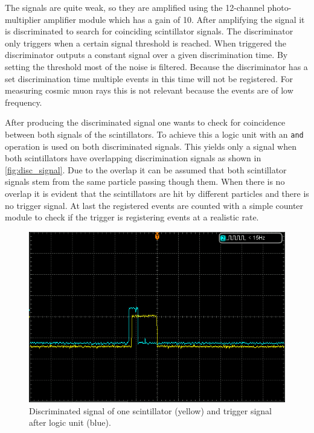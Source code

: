 \documentclass[sn-mathphys-num,iicol]{sn-jnl}
\theoremstyle{thmstyleone}
\theoremstyle{thmstyletwo}
\theoremstyle{thmstylethree}
\begin{document}
The signals are quite weak, so they are amplified using the 12-channel photo-multiplier amplifier module which has a gain of 10.
After amplifying the signal it is discriminated to search for coinciding scintillator signals.
The discriminator only triggers when a certain signal threshold is reached. 
When triggered the discriminator outputs a constant signal over a given discrimination time.
By setting the threshold most of the noise is filtered.
Because the discriminator has a set discrimination time multiple events in this time will not be registered. 
For measuring cosmic muon rays this is not relevant because the events are of low frequency.

After producing the discriminated signal one wants to check for coincidence between both signals of the scintillators.
To achieve this a logic unit with an \texttt{and} operation is used on both discriminated signals.
This yields only a signal when both scintillators have overlapping discrimination signals as shown in \autoref{fig:disc_signal}.
Due to the overlap it can be assumed that both scintillator signals stem from the same particle passing though them.
When there is no overlap it is evident that the scintillators are hit by different particles and there is no trigger signal.
At last the registered events are counted with a simple counter module to check if the trigger is registering events at a realistic rate.

\begin{figure}
  \includegraphics[width=\linewidth]{figures/DS1Z_QuickPrint2_cropped.png}
  \caption{Discriminated signal of one scintillator (yellow) and trigger signal after logic unit (blue).}
  \label{fig:disc_signal}
\end{figure}
\end{document}
